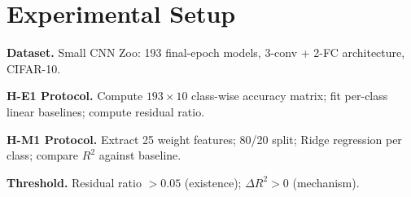 \section{Experimental Setup}

\textbf{Dataset.} Small CNN Zoo: 193 final-epoch models, 3-conv + 2-FC architecture, CIFAR-10.

\textbf{H-E1 Protocol.} Compute $193 \times 10$ class-wise accuracy matrix; fit per-class linear baselines; compute residual ratio.

\textbf{H-M1 Protocol.} Extract 25 weight features; 80/20 split; Ridge regression per class; compare $R^2$ against baseline.

\textbf{Threshold.} Residual ratio $> 0.05$ (existence); $\Delta R^2 > 0$ (mechanism).
